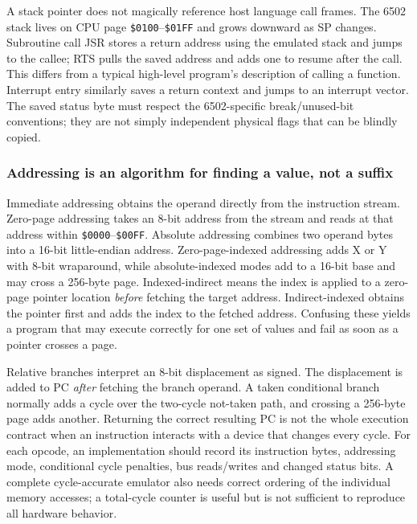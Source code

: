 A stack pointer does not magically reference host language call frames. The 6502 stack lives on CPU page \texttt{\$0100}--\texttt{\$01FF} and grows downward as SP changes. Subroutine call JSR stores a return address using the emulated stack and jumps to the callee; RTS pulls the saved address and adds one to resume after the call. This differs from a typical high-level program's description of calling a function. Interrupt entry similarly saves a return context and jumps to an interrupt vector. The saved status byte must respect the 6502-specific break/unused-bit conventions; they are not simply independent physical flags that can be blindly copied.

\subsubsection{Addressing is an algorithm for finding a value, not a suffix}\label{06-engine-ii-ch042-addressing-is-an-algorithm-for-finding-a-value-not-a-suffix}

\hypertarget{06-engine-ii-ch042-addressing-is-an-algorithm-for-finding-a-value-not-a-suffix}{}

Immediate addressing obtains the operand directly from the instruction stream. Zero-page addressing takes an 8-bit address from the stream and reads at that address within \texttt{\$0000}--\texttt{\$00FF}. Absolute addressing combines two operand bytes into a 16-bit little-endian address. Zero-page-indexed addressing adds X or Y with 8-bit wraparound, while absolute-indexed modes add to a 16-bit base and may cross a 256-byte page. Indexed-indirect means the index is applied to a zero-page pointer location \emph{before} fetching the target address. Indirect-indexed obtains the pointer first and adds the index to the fetched address. Confusing these yields a program that may execute correctly for one set of values and fail as soon as a pointer crosses a page.

Relative branches interpret an 8-bit displacement as signed. The displacement is added to PC \emph{after} fetching the branch operand. A taken conditional branch normally adds a cycle over the two-cycle not-taken path, and crossing a 256-byte page adds another. Returning the correct resulting PC is not the whole execution contract when an instruction interacts with a device that changes every cycle. For each opcode, an implementation should record its instruction bytes, addressing mode, conditional cycle penalties, bus reads/writes and changed status bits. A complete cycle-accurate emulator also needs correct ordering of the individual memory accesses; a total-cycle counter is useful but is not sufficient to reproduce all hardware behavior.


